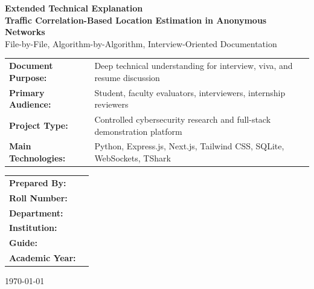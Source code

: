 \documentclass[12pt,a4paper]{report}
\begin{document}
\begin{titlepage}
    \centering
    \vspace*{1.5cm}
    {\Large \textbf{Extended Technical Explanation}}\\[1.0cm]
    {\Huge \textbf{Traffic Correlation-Based Location Estimation in Anonymous Networks}}\\[1.0cm]
    {\Large File-by-File, Algorithm-by-Algorithm, Interview-Oriented Documentation}\\[1.8cm]

    \begin{tabular}{>{\bfseries}p{5cm}p{8cm}}
        Document Purpose: & Deep technical understanding for interview, viva, and resume discussion \\
        Primary Audience: & Student, faculty evaluators, interviewers, internship reviewers \\
        Project Type: & Controlled cybersecurity research and full-stack demonstration platform \\
        Main Technologies: & Python, Express.js, Next.js, Tailwind CSS, SQLite, WebSockets, TShark \\
    \end{tabular}

    \vfill

    \begin{tabular}{>{\bfseries}p{5cm}p{8cm}}
        Prepared By: & \underline{\hspace{7cm}} \\
        Roll Number: & \underline{\hspace{7cm}} \\
        Department: & \underline{\hspace{7cm}} \\
        Institution: & \underline{\hspace{7cm}} \\
        Guide: & \underline{\hspace{7cm}} \\
        Academic Year: & \underline{\hspace{7cm}} \\
    \end{tabular}

    \vfill
    {\large \today}
\end{titlepage}

\tableofcontents
\listoftables
\listoffigures

\clearpage
{}
\end{document}
